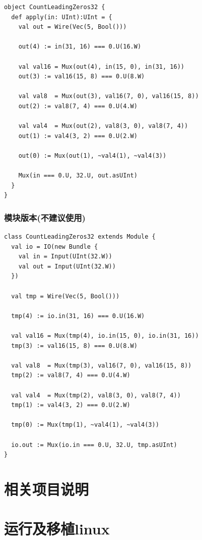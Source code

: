 \documentclass[lang=cn,11pt,a4paper]{elegantpaper}
\begin{document}
\begin{lstlisting}
object CountLeadingZeros32 {
  def apply(in: UInt):UInt = {
    val out = Wire(Vec(5, Bool()))

    out(4) := in(31, 16) === 0.U(16.W)

    val val16 = Mux(out(4), in(15, 0), in(31, 16))
    out(3) := val16(15, 8) === 0.U(8.W)

    val val8  = Mux(out(3), val16(7, 0), val16(15, 8))
    out(2) := val8(7, 4) === 0.U(4.W)

    val val4  = Mux(out(2), val8(3, 0), val8(7, 4))
    out(1) := val4(3, 2) === 0.U(2.W)

    out(0) := Mux(out(1), ~val4(1), ~val4(3))

    Mux(in === 0.U, 32.U, out.asUInt)
  }
}
\end{lstlisting}

\subsubsection{模块版本(不建议使用)}

\begin{lstlisting}
class CountLeadingZeros32 extends Module {
  val io = IO(new Bundle {
	val in = Input(UInt(32.W))
	val out = Input(UInt(32.W))
  })

  val tmp = Wire(Vec(5, Bool()))

  tmp(4) := io.in(31, 16) === 0.U(16.W)

  val val16 = Mux(tmp(4), io.in(15, 0), io.in(31, 16))
  tmp(3) := val16(15, 8) === 0.U(8.W)

  val val8  = Mux(tmp(3), val16(7, 0), val16(15, 8))
  tmp(2) := val8(7, 4) === 0.U(4.W)

  val val4  = Mux(tmp(2), val8(3, 0), val8(7, 4))
  tmp(1) := val4(3, 2) === 0.U(2.W)

  tmp(0) := Mux(tmp(1), ~val4(1), ~val4(3))

  io.out := Mux(io.in === 0.U, 32.U, tmp.asUInt)
}
\end{lstlisting}

\section{相关项目说明}

\section{运行及移植linux}

\newpage

\nocite{*}
%

\end{document}
